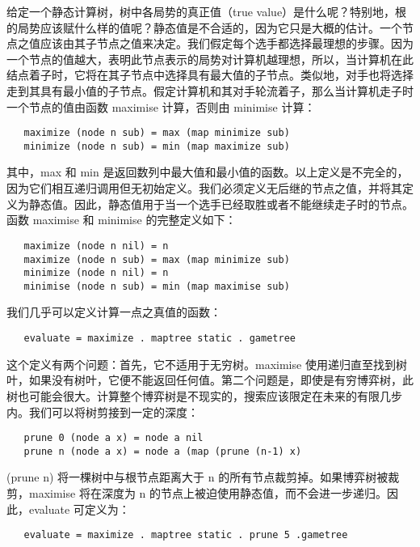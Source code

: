 \documentclass[12pt]{article}
\begin{document}
给定一个静态计算树，树中各局势的真正值（true value）是什么呢？特别地，根的局势应该赋什么样的值呢？静态值是不合适的，因为它只是大概的估计。一个节点之值应该由其子节点之值来决定。我们假定每个选手都选择最理想的步骤。因为一个节点的值越大，表明此节点表示的局势对计算机越理想，所以，当计算机在此结点着子时，它将在其子节点中选择具有最大值的子节点。类似地，对手也将选择走到其具有最小值的子节点。假定计算机和其对手轮流着子，那么当计算机走子时一个节点的值由函数 maximise 计算，否则由 minimise 计算：

\begin{verbatim}
   maximize (node n sub) = max (map minimize sub)
   minimize (node n sub) = min (map maximize sub)
\end{verbatim}

其中，max 和 min 是返回数列中最大值和最小值的函数。以上定义是不完全的，因为它们相互递归调用但无初始定义。我们必须定义无后继的节点之值，并将其定义为静态值。因此，静态值用于当一个选手已经取胜或者不能继续走子时的节点。函数 maximise 和 minimise 的完整定义如下：

\begin{verbatim}
   maximize (node n nil) = n
   maximize (node n sub) = max (map minimize sub)
   minimize (node n nil) = n
   minimise (node n sub) = min (map maximise sub)
\end{verbatim}

我们几乎可以定义计算一点之真值的函数：

\begin{verbatim}
   evaluate = maximize . maptree static . gametree
\end{verbatim}

这个定义有两个问题：首先，它不适用于无穷树。maximise 使用递归直至找到树叶，如果没有树叶，它便不能返回任何值。第二个问题是，即使是有穷博弈树，此树也可能会很大。计算整个博弈树是不现实的，搜索应该限定在未来的有限几步内。我们可以将树剪接到一定的深度：

\begin{verbatim}
   prune 0 (node a x) = node a nil
   prune n (node a x) = node a (map (prune (n-1) x)
\end{verbatim}

(prune n) 将一棵树中与根节点距离大于 n 的所有节点裁剪掉。如果博弈树被裁剪，maximise 将在深度为 n 的节点上被迫使用静态值，而不会进一步递归。因此，evaluate 可定义为：

\begin{verbatim}
   evaluate = maximize . maptree static . prune 5 .gametree
\end{verbatim}
\end{document}
